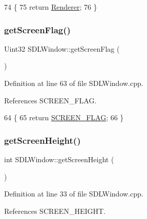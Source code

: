 \begin{DoxyCode}
74 \{
75     \textcolor{keywordflow}{return} \hyperlink{class_s_d_l_window_ae679402fd05b8eb3fd8680f1f036aaca}{Renderer};
76 \}
\end{DoxyCode}
\mbox{\label{class_s_d_l_window_adec65d41c9403d18cc23389a62f1897a}} 
\subsubsection{\texorpdfstring{get\+Screen\+Flag()}{getScreenFlag()}}
{\footnotesize\ttfamily Uint32 S\+D\+L\+Window\+::get\+Screen\+Flag (\begin{DoxyParamCaption}{ }\end{DoxyParamCaption})}



Definition at line 63 of file S\+D\+L\+Window.\+cpp.



References S\+C\+R\+E\+E\+N\+\_\+\+F\+L\+AG.


\begin{DoxyCode}
64 \{
65     \textcolor{keywordflow}{return} \hyperlink{class_s_d_l_window_a52d0a3b9ea7107e63476b24bc8a43397}{SCREEN\_FLAG};
66 \}
\end{DoxyCode}
\mbox{\label{class_s_d_l_window_ae3220fe9d6ef946c50713c7e4b72d637}} 
\subsubsection{\texorpdfstring{get\+Screen\+Height()}{getScreenHeight()}}
{\footnotesize\ttfamily int S\+D\+L\+Window\+::get\+Screen\+Height (\begin{DoxyParamCaption}{ }\end{DoxyParamCaption})}



Definition at line 33 of file S\+D\+L\+Window.\+cpp.



References S\+C\+R\+E\+E\+N\+\_\+\+H\+E\+I\+G\+HT.



